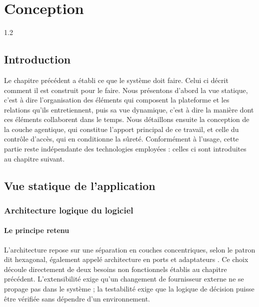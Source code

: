 \chapter{Conception}

\begin{spacing}{1.2}
\minitoc
\thispagestyle{MyStyle}
\end{spacing}
\newpage

\section*{Introduction}

Le chapitre précédent a établi ce que le système doit faire. Celui ci décrit comment il est construit pour le faire. Nous présentons d'abord la vue statique, c'est à dire l'organisation des éléments qui composent la plateforme et les relations qu'ils entretiennent, puis sa vue dynamique, c'est à dire la manière dont ces éléments collaborent dans le temps. Nous détaillons ensuite la conception de la couche agentique, qui constitue l'apport principal de ce travail, et celle du contrôle d'accès, qui en conditionne la sûreté. Conformément à l'usage, cette partie reste indépendante des technologies employées : celles ci sont introduites au chapitre suivant.

\section{Vue statique de l'application}

\subsection{Architecture logique du logiciel}

\subsubsection{Le principe retenu}

L'architecture repose sur une séparation en couches concentriques, selon le patron dit hexagonal, également appelé architecture en ports et adaptateurs \cite{cockburn, martin}. Ce choix découle directement de deux besoins non fonctionnels établis au chapitre précédent. L'extensibilité exige qu'un changement de fournisseur externe ne se propage pas dans le système ; la testabilité exige que la logique de décision puisse être vérifiée sans dépendre d'un environnement.

